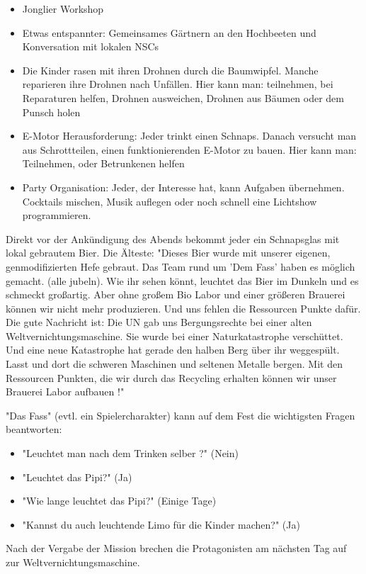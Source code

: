 \begin{itemize}
\item Jonglier Workshop
\item Etwas entspannter: Gemeinsames Gärtnern an den Hochbeeten und Konversation mit lokalen NSCs
\item Die Kinder rasen mit ihren Drohnen durch die Baumwipfel. Manche reparieren ihre Drohnen nach Unfällen. Hier kann man: teilnehmen, bei Reparaturen helfen, Drohnen ausweichen, Drohnen aus Bäumen oder dem Punsch holen
\item E-Motor Herausforderung: Jeder trinkt einen Schnaps. Danach versucht man aus Schrottteilen, einen funktionierenden E-Motor zu bauen. Hier kann man: Teilnehmen, oder Betrunkenen helfen
\item Party Organisation: Jeder, der Interesse hat, kann Aufgaben übernehmen. Cocktails mischen, Musik auflegen oder noch schnell eine Lichtshow programmieren.
\end{itemize}

Direkt vor der Ankündigung des Abends bekommt jeder ein Schnapsglas mit lokal gebrautem Bier. Die Älteste: "Dieses Bier wurde mit unserer eigenen, genmodifizierten Hefe gebraut. Das Team rund um 'Dem Fass' haben es möglich gemacht. (alle jubeln). Wie ihr sehen könnt, leuchtet das Bier im Dunkeln und es schmeckt großartig. Aber ohne großem Bio Labor und einer größeren Brauerei können wir nicht mehr produzieren. Und uns fehlen die Ressourcen Punkte dafür. Die gute Nachricht ist: Die UN gab uns Bergungsrechte bei einer alten Weltvernichtungsmaschine. Sie wurde bei einer Naturkatastrophe verschüttet. Und eine neue Katastrophe hat gerade den halben Berg über ihr weggespült. Lasst und dort die schweren Maschinen und seltenen Metalle bergen. Mit den Ressourcen Punkten, die wir durch das Recycling erhalten können wir unser Brauerei Labor aufbauen !"

"Das Fass" (evtl. ein Spielercharakter) kann auf dem Fest die wichtigsten Fragen beantworten:
\begin{itemize}
\item "Leuchtet man nach dem Trinken selber ?" (Nein)
\item "Leuchtet das Pipi?" (Ja)
\item "Wie lange leuchtet das Pipi?" (Einige Tage)
\item "Kannst du auch leuchtende Limo für die Kinder machen?" (Ja)
\end{itemize}

Nach der Vergabe der Mission brechen die Protagonisten am nächsten Tag auf zur Weltvernichtungsmaschine.

